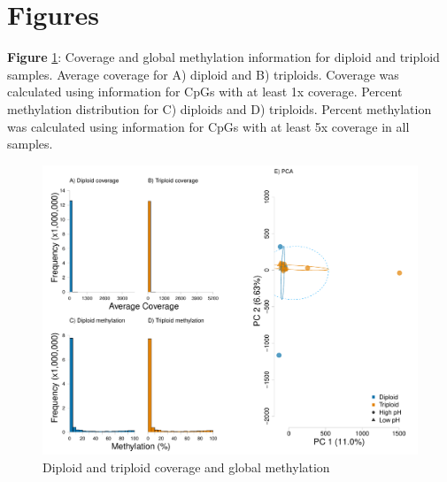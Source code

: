 \documentclass [11pt, proquest] {uwthesis}[2015/03/03]
\begin{document}
\clearpage

\hypertarget{figures-3}{%
\section{Figures}\label{figures-3}}

\textbf{Figure} \ref{fig:coveragemeth}: Coverage and global methylation information for diploid and triploid samples. Average coverage for A) diploid and B) triploids. Coverage was calculated using information for CpGs with at least 1x coverage. Percent methylation distribution for C) diploids and D) triploids. Percent methylation was calculated using information for CpGs with at least 5x coverage in all samples.\newline
\begin{figure}[h]
\centering
  \includegraphics[width=1\textwidth]{figure/Ch4/Figure4.1.pdf}
  \caption{Diploid and triploid coverage and global methylation}
  \label{fig:coveragemeth}
\end{figure}
\clearpage
\end{document}
